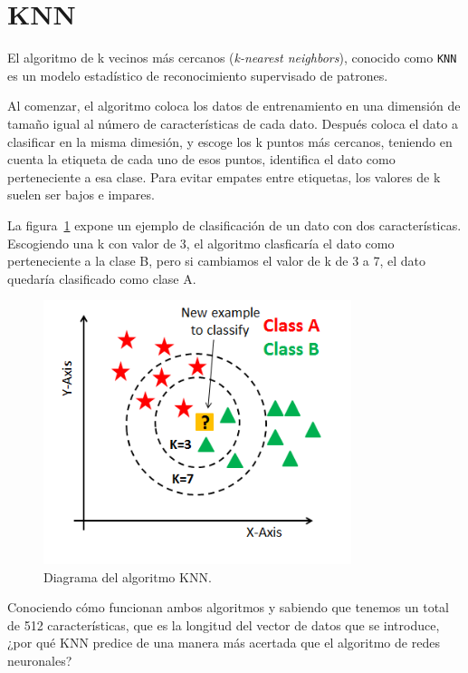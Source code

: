 \documentclass[a4paper, 12pt]{book}
\begin{document}
\section*{KNN}
\label{sec:knn}

El algoritmo de k vecinos más cercanos (\textit{k-nearest neighbors}), conocido como \texttt{KNN}~\cite{tikariha2018comparative} es un modelo estadístico de reconocimiento supervisado de patrones.

Al comenzar, el algoritmo coloca los datos de entrenamiento en una dimensión de tamaño igual al número de características de cada dato. Después coloca el dato a clasificar en la misma dimesión, y escoge los k puntos más cercanos, teniendo en cuenta la etiqueta de cada uno de esos puntos, identifica el dato como perteneciente a esa clase. Para evitar empates entre etiquetas, los valores de k suelen ser bajos e impares.

La figura~\ref{fig:knn-diagram} expone un ejemplo de clasificación de un dato con dos características. Escogiendo una k con valor de 3, el algoritmo clasficaría el dato como perteneciente a la clase B, pero si cambiamos el valor de k de 3 a 7, el dato quedaría clasificado como clase A.

\begin{figure}
	\centering
	\includegraphics[width=9cm]{img/knn-diagram.png}
	\caption{Diagrama del algoritmo KNN.}\label{fig:knn-diagram}
\end{figure}

\pagebreak

Conociendo cómo funcionan ambos algoritmos y sabiendo que tenemos un total de 512 características, que es la longitud del vector de datos que se introduce, ¿por qué KNN predice de una manera más acertada que el algoritmo de redes neuronales?
\end{document}
